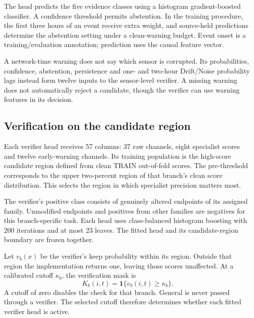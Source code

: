The head predicts the five evidence classes using a histogram gradient-boosted classifier. A confidence threshold permits abstention. In the training procedure, the first three hours of an event receive extra weight, and source-held predictions determine the abstention setting under a clean-warning budget. Event onset is a training/evaluation annotation; prediction uses the causal feature vector.

A network-time warning does not say which sensor is corrupted. Its probabilities, confidence, abstention, persistence and one- and two-hour Drift/Noise probability lags instead form twelve inputs to the sensor-level verifier. A missing warning does not automatically reject a candidate, though the verifier can use warning features in its decision.

\subsection{Verification on the candidate region}
Each verifier head receives 57 columns: 37 raw channels, eight specialist scores and twelve early-warning channels. Its training population is the high-score candidate region defined from clean TRAIN out-of-fold scores. The pre-threshold corresponds to the upper two-percent region of that branch's clean score distribution. This selects the region in which specialist precision matters most.

The verifier's positive class consists of genuinely altered endpoints of its assigned family. Unmodified endpoints and positives from other families are negatives for this branch-specific task. Each head uses class-balanced histogram boosting with 200 iterations and at most 23 leaves. The fitted head and its candidate-region boundary are frozen together.

Let $v_b(x)$ be the verifier's keep probability within its region. Outside that region the implementation returns one, leaving those scores unaffected. At a calibrated cutoff $\kappa_b$, the verification mask is
\begin{equation}
 K_b(i,t)=\mathbf1\{v_b(i,t)\geq\kappa_b\}.
\end{equation}
A cutoff of zero disables the check for that branch. General is never passed through a verifier. The selected cutoff therefore determines whether each fitted verifier head is active.

